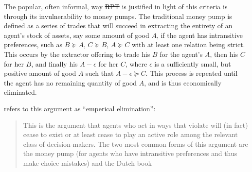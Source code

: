 \documentclass[11pt,a4paper]{report}
\providecommand{\DIFaddtex}[1]{{\protect\color{blue}\uwave{#1}}} %
\providecommand{\DIFdeltex}[1]{{\protect\color{red}\sout{#1}}}                      %
\providecommand{\DIFaddbegin}{} %
\providecommand{\DIFaddend}{} %
\providecommand{\DIFdelbegin}{} %
\providecommand{\DIFdelend}{} %
\providecommand{\DIFadd}[1]{\texorpdfstring{\DIFaddtex{#1}}{#1}} %
\providecommand{\DIFdel}[1]{\texorpdfstring{\DIFdeltex{#1}}{}} %
\newcommand{\DIFscaledelfig}{0.5}
\newlength{\DIFdelgraphicswidth} %
\newlength{\DIFdelgraphicsheight} %
\newcommand{\DIFaddincludegraphics}[2][]{{\color{blue}\fbox{\DIFOincludegraphics[#1]{#2}}}} %
\newcommand{\DIFdelincludegraphics}[2][]{%
\sbox{\DIFdelgraphicsbox}{\DIFOincludegraphics[#1]{#2}}%
\settoboxwidth{\DIFdelgraphicswidth}{\DIFdelgraphicsbox} %
\settoboxtotalheight{\DIFdelgraphicsheight}{\DIFdelgraphicsbox} %
\scalebox{\DIFscaledelfig}{%
\parbox[b]{\DIFdelgraphicswidth}{\usebox{\DIFdelgraphicsbox}\\[-\baselineskip] \rule{\DIFdelgraphicswidth}{0em}}\llap{\resizebox{\DIFdelgraphicswidth}{\DIFdelgraphicsheight}{%
\setlength{\unitlength}{\DIFdelgraphicswidth}%
\begin{picture}(1,1)%
\thicklines\linethickness{2pt} %
{\color[rgb]{1,0,0}\put(0,0){\framebox(1,1){}}}%
{\color[rgb]{1,0,0}\put(0,0){\line( 1,1){1}}}%
{\color[rgb]{1,0,0}\put(0,1){\line(1,-1){1}}}%
\end{picture}%
}\hspace*{3pt}}} %
} %
\DeclareRobustCommand{\DIFaddbegin}{\DIFOaddbegin \let\includegraphics\DIFaddincludegraphics} %
\DeclareRobustCommand{\DIFaddend}{\DIFOaddend \let\includegraphics\DIFOincludegraphics} %
\DeclareRobustCommand{\DIFdelbegin}{\DIFOdelbegin \let\includegraphics\DIFdelincludegraphics} %
\DeclareRobustCommand{\DIFdelend}{\DIFOaddend \let\includegraphics\DIFOincludegraphics} %
\begin{document}
\addtocounter{footnote}{-1}

The popular, often informal, way \DIFdelbegin \DIFdel{RPT }\DIFdelend \DIFaddbegin \DIFadd{EUT }\DIFaddend is justified in light of this criteria is through its invulnerability to money pumps.
The traditional money pump is defined as a series of trades that will succeed in extracting the entirety of an agent's stock of assets, say some amount of good $A$, if the agent has intransitive preferences, such as $B \succcurlyeq A$, $C \succcurlyeq B$, $A \succcurlyeq C$ with at least one relation being strict.
This occurs by the extractor offering to trade his $B$ for the agent's $A$, then his $C$ for her $B$, and finally his $A - \epsilon$ for her $C$, where $\epsilon$ is a sufficiently small, but positive amount of good $A$ such that $A - \epsilon \succcurlyeq C$.
This process is repeated until the agent has no remaining quantity of good $A$, and is thus economically eliminated.

\textcite[402-403]{Hands2014} refers to this argument as \enquote{emperical elimination}:
\DIFdelbegin %
\DIFdelend \DIFaddbegin \blockquote{
This is the argument that agents who act in ways that violate  will (in fact) cease to exist or at least cease to play an active role among the relevant class of decision-makers.
The two most common forms of this argument are the money pump (for agents who have intransitive preferences and thus make choice mistakes) and the Dutch book\textelp{}
}
\DIFaddend 
\end{document}
